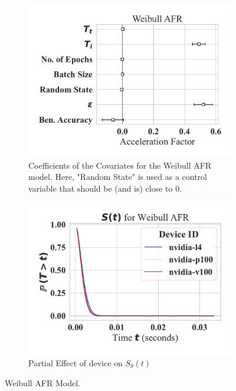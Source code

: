\documentclass[conference]{IEEEtran}
\begin{document}
\begin{figure}[h!]
    \centering
    \captionsetup[subfigure]{skip=0pt} %
    \begin{subfigure}[b]{\linewidth}
        \centering
        \includegraphics[width=.6\linewidth,clip]{plots/combined/weibull_aft.pdf}
        \caption{Coefficients of the Covariates for the Weibull AFR model. Here, "Random State" is used as a control variable that should be (and is) close to 0.}
        \label{fig:aft}
    \end{subfigure}
    \begin{subfigure}[b]{\linewidth}
        \centering
        \includegraphics[width=.6\linewidth,clip]{plots/combined/weibull_device_num_partial_effect.pdf}
        \caption{Partial Effect  of device on $S_{\theta}(t)$ }
        \label{fig:partial}
    \end{subfigure}
    \caption{Weibull AFR Model.}
\end{figure}
\end{document}
